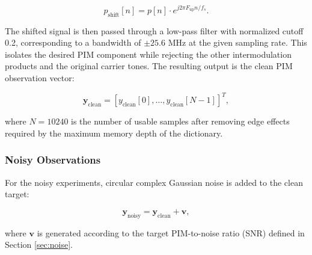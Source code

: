 \begin{equation}
p_{\mathrm{shift}}[n] = p[n] \cdot e^{j 2\pi F_{\mathrm{up}} n / f_s}.
\end{equation}

The shifted signal is then passed through a low-pass filter with normalized cutoff 0.2, corresponding to a bandwidth of \( \pm 25.6 \) MHz at the given sampling rate. This isolates the desired PIM component while rejecting the other intermodulation products and the original carrier tones. The resulting output is the clean PIM observation vector:

\begin{equation}
\mathbf{y}_{\mathrm{clean}} = [y_{\mathrm{clean}}[0], \ldots, y_{\mathrm{clean}}[N-1]]^T,
\end{equation}

where \( N = 10240 \) is the number of usable samples after removing edge effects required by the maximum memory depth of the dictionary.

\subsubsection{Noisy Observations}

For the noisy experiments, circular complex Gaussian noise is added to the clean target:

\begin{equation}
\mathbf{y}_{\mathrm{noisy}} = \mathbf{y}_{\mathrm{clean}} + \mathbf{v},
\end{equation}

where \( \mathbf{v} \) is generated according to the target PIM-to-noise ratio (SNR) defined in Section \ref{sec:noise}.